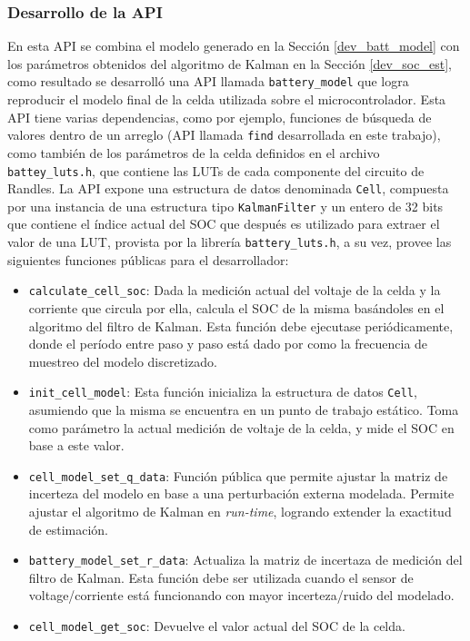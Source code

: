 \documentclass[10pt, a4paper]{report}
\begin{document}
\subsubsection{Desarrollo de la \acrshort{API}}

En esta \acrshort{API} se combina el modelo generado en la Secci\'on
\ref{dev_batt_model} con los par\'ametros obtenidos del algoritmo de Kalman en
la Secci\'on \ref{dev_soc_est}, como resultado se desarroll\'o una \acrshort{API}
llamada \texttt{battery\_model} que logra reproducir el modelo final de la celda
utilizada sobre el microcontrolador. Esta \acrshort{API} tiene varias 
dependencias, como por ejemplo, funciones de b\'usqueda de valores dentro de un 
arreglo (\acrshort{API} llamada \texttt{find} desarrollada en este trabajo), 
como tambi\'en de los par\'ametros de la celda definidos en el archivo 
\texttt{battey\_luts.h}, que contiene las \acrshort{LUT}s de cada componente del
circuito de Randles. La \acrshort{API} expone una estructura de datos denominada
\texttt{Cell}, compuesta por una instancia de una estructura tipo
\texttt{KalmanFilter} y un entero de 32 bits que contiene el \'indice actual del
\acrshort{SOC} que despu\'es es utilizado para extraer el valor de una
\acrshort{LUT}, provista por la librer\'ia \texttt{battery\_luts.h}, a su vez,
provee las siguientes funciones p\'ublicas para el desarrollador: 

\begin{itemize}
    \item \texttt{calculate\_cell\_soc}: Dada la medici\'on actual del voltaje de
        la celda y la corriente que circula por ella, calcula el \acrshort{SOC}
        de la misma bas\'andoles en el algoritmo del filtro de Kalman. Esta
        funci\'on debe ejecutase peri\'odicamente, donde el per\'iodo entre
        paso y paso est\'a dado por como la frecuencia de muestreo del modelo
        discretizado.
    \item \texttt{init\_cell\_model}: Esta funci\'on inicializa la estructura de
        datos \texttt{Cell}, asumiendo que la misma se encuentra en un punto de
        trabajo est\'atico. Toma como par\'ametro la actual medici\'on de
        voltaje de la celda, y mide el \acrshort{SOC} en base a este valor.
    \item \texttt{cell\_model\_set\_q\_data}: Funci\'on p\'ublica que permite
        ajustar la matriz de incerteza del modelo en base a una perturbaci\'on
        externa modelada. Permite ajustar el algoritmo de Kalman en 
        \emph{run-time}, logrando extender la exactitud de estimaci\'on.
    \item \texttt{battery\_model\_set\_r\_data}: Actualiza la matriz de
        incertaza de medici\'on del filtro de Kalman. Esta funci\'on debe ser
        utilizada cuando el sensor de voltage/corriente est\'a funcionando con
        mayor incerteza/ruido del modelado.
    \item \texttt{cell\_model\_get\_soc}: Devuelve el valor actual del
        \acrshort{SOC} de la celda.
\end{itemize}
\end{document}
